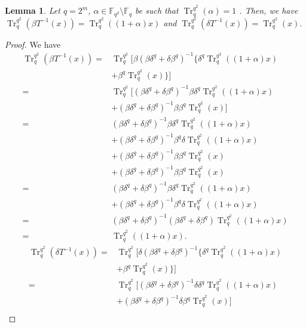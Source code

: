 \documentclass{birkjour}
\newtheorem{lem}[thm]{Lemma}
\theoremstyle{definition}
\theoremstyle{remark}
\numberwithin{equation}{section}
\begin{document}
	\begin{lem} \label{lem3}
		Let $q=2^m$, $\alpha\in\mathbb{F}_{q^2}\setminus\mathbb{F}_q$ be such that $\operatorname{Tr}_q^{q^2}(\alpha)=1$ . Then, we have 
		$\operatorname{Tr}_{q}^{q^2}(\beta T^{-1}(x))=\operatorname{Tr}_{q}^{q^2}((1+\alpha)x)$ and 
		$\operatorname{Tr}_{q}^{q^2}(\delta T^{-1}(x))=\operatorname{Tr}_{q}^{q^2}(x).$
	\end{lem}
\begin{proof}	
	We have 
		\begin{align*}
		\operatorname{Tr}_{q}^{q^2}(\beta T^{-1}(x))=&\operatorname{Tr}_{q}^{q^2}[\beta(\beta\delta^{q}+\delta\beta^{q})^{-1}\{\delta^{q}\operatorname{Tr}_{q}^{q^2}((1+\alpha)x)\\&+\beta^{q}\operatorname{Tr}_{q}^{q^2}(x)\}]\\
		=&\operatorname{Tr}_{q}^{q^2}[(\beta\delta^{q}+\delta\beta^{q})^{-1}\beta\delta^{q}\operatorname{Tr}_{q}^{q^2}((1+\alpha)x)\\&+(\beta\delta^{q}+\delta\beta^{q})^{-1}\beta\beta^{q}\operatorname{Tr}_{q}^{q^2}(x)]\\
		=&(\beta\delta^{q}+\delta\beta^{q})^{-1}\beta\delta^{q}\operatorname{Tr}_{q}^{q^2}((1+\alpha)x)\\&+(\beta\delta^{q}+\delta\beta^{q})^{-1}\beta^{q}\delta\operatorname{Tr}_{q}^{q^2}((1+\alpha)x)\\&+(\beta\delta^{q}+\delta\beta^{q})^{-1}\beta\beta^{q}\operatorname{Tr}_{q}^{q^2}(x)\\&+(\beta\delta^{q}+\delta\beta^{q})^{-1}\beta\beta^{q}\operatorname{Tr}_{q}^{q^2}(x)\\
		=&(\beta\delta^{q}+\delta\beta^{q})^{-1}\beta\delta^{q}\operatorname{Tr}_{q}^{q^2}((1+\alpha)x)\\&+(\beta\delta^{q}+\delta\beta^{q})^{-1}\beta^{q}\delta\operatorname{Tr}_{q}^{q^2}((1+\alpha)x)\\
		=&(\beta\delta^{q}+\delta\beta^{q})^{-1}(\beta\delta^{q}+\delta\beta^{q})\operatorname{Tr}_{q}^{q^2}((1+\alpha)x)\\
		=&\operatorname{Tr}_{q}^{q^2}((1+\alpha)x).
	\end{align*}
	\begin{align*}
		\operatorname{Tr}_{q}^{q^2}(\delta T^{-1}(x))=&\operatorname{Tr}_{q}^{q^2}[\delta(\beta\delta^{q}+\delta\beta^{q})^{-1}\{\delta^{q}\operatorname{Tr}_{q}^{q^2}((1+\alpha)x)\\&+\beta^{q}\operatorname{Tr}_{q}^{q^2}(x)\}]\\
		=&\operatorname{Tr}_{q}^{q^2}[(\beta\delta^{q}+\delta\beta^{q})^{-1}\delta\delta^{q}\operatorname{Tr}_{q}^{q^2}((1+\alpha)x)\\&+(\beta\delta^{q}+\delta\beta^{q})^{-1}\delta\beta^{q}\operatorname{Tr}_{q}^{q^2}(x)]\\

\end{align*}
\end{proof}
\end{document}
